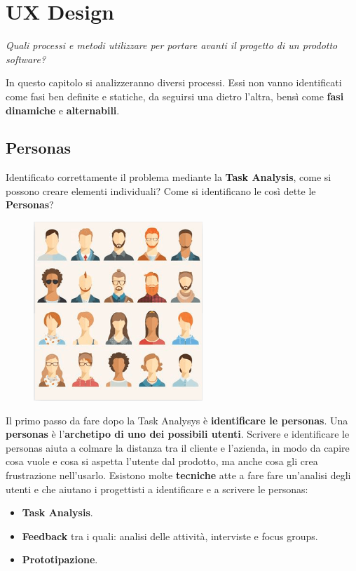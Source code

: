 \chapter{UX Design}
\begin{flushleft}
	\textit{Quali processi e metodi utilizzare per portare avanti il progetto di un
		prodotto software?}
\end{flushleft}

In questo capitolo si analizzeranno diversi processi.
Essi non vanno identificati come fasi ben definite e statiche, da seguirsi una dietro l'altra, bensì come \textbf{fasi} \textbf{dinamiche} e \textbf{alternabili}.

\section{Personas}
Identificato correttamente il problema mediante la \textbf{Task Analysis}, come si  possono creare elementi individuali? Come si identificano le così dette le \textbf{Personas}?

\begin{figure}[!h]
	\centering
	\includegraphics[scale=0.55]{immagini/Personas.png}
\end{figure}

Il primo passo da fare dopo la Task Analysys è \textbf{identificare le personas}.
Una \textbf{personas} è l'\textbf{archetipo di uno dei possibili utenti}. Scrivere e
identificare le personas aiuta a colmare la distanza tra il cliente e l'azienda, in modo da capire cosa vuole e cosa si aspetta l'utente dal prodotto, ma anche cosa gli crea frustrazione nell'usarlo. Esistono molte \textbf{tecniche} atte a fare fare un'analisi degli utenti e che aiutano i progettisti a identificare e a scrivere le personas:

\begin{itemize}
	\item \textbf{Task Analysis}.
	\item \textbf{Feedback} tra i quali: analisi delle attività, interviste e focus groups.
	\item \textbf{Prototipazione}.
\end{itemize}

